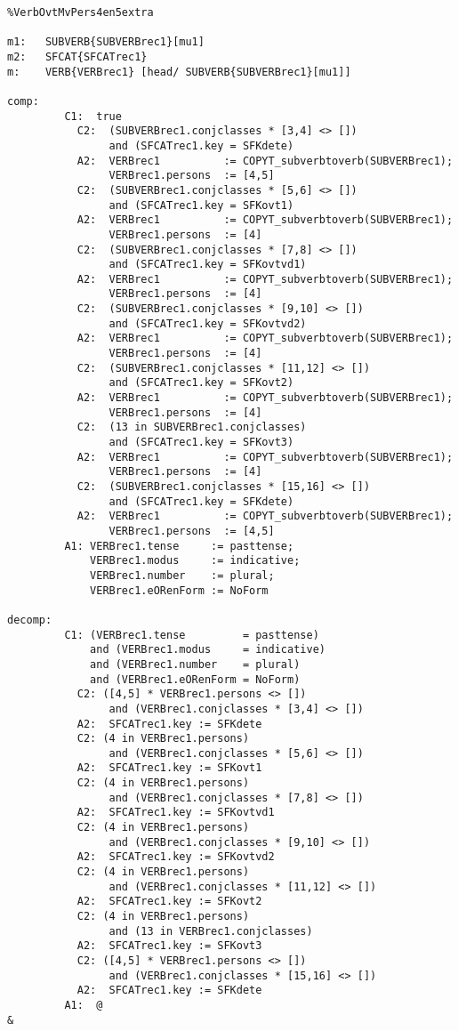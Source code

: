 \begin{verbatim}
%VerbOvtMvPers4en5extra

m1:   SUBVERB{SUBVERBrec1}[mu1]
m2:   SFCAT{SFCATrec1}
m:    VERB{VERBrec1} [head/ SUBVERB{SUBVERBrec1}[mu1]]

comp:
         C1:  true
           C2:  (SUBVERBrec1.conjclasses * [3,4] <> [])
                and (SFCATrec1.key = SFKdete)
           A2:  VERBrec1          := COPYT_subverbtoverb(SUBVERBrec1);
                VERBrec1.persons  := [4,5]
           C2:  (SUBVERBrec1.conjclasses * [5,6] <> [])
                and (SFCATrec1.key = SFKovt1)
           A2:  VERBrec1          := COPYT_subverbtoverb(SUBVERBrec1);
                VERBrec1.persons  := [4]
           C2:  (SUBVERBrec1.conjclasses * [7,8] <> [])
                and (SFCATrec1.key = SFKovtvd1)
           A2:  VERBrec1          := COPYT_subverbtoverb(SUBVERBrec1);
                VERBrec1.persons  := [4]
           C2:  (SUBVERBrec1.conjclasses * [9,10] <> [])
                and (SFCATrec1.key = SFKovtvd2)
           A2:  VERBrec1          := COPYT_subverbtoverb(SUBVERBrec1);
                VERBrec1.persons  := [4]
           C2:  (SUBVERBrec1.conjclasses * [11,12] <> [])
                and (SFCATrec1.key = SFKovt2)
           A2:  VERBrec1          := COPYT_subverbtoverb(SUBVERBrec1);
                VERBrec1.persons  := [4]
           C2:  (13 in SUBVERBrec1.conjclasses) 
                and (SFCATrec1.key = SFKovt3)
           A2:  VERBrec1          := COPYT_subverbtoverb(SUBVERBrec1);
                VERBrec1.persons  := [4]
           C2:  (SUBVERBrec1.conjclasses * [15,16] <> []) 
                and (SFCATrec1.key = SFKdete)
           A2:  VERBrec1          := COPYT_subverbtoverb(SUBVERBrec1);
                VERBrec1.persons  := [4,5]
         A1: VERBrec1.tense     := pasttense;
             VERBrec1.modus     := indicative;
             VERBrec1.number    := plural;
             VERBrec1.eORenForm := NoForm

decomp:
         C1: (VERBrec1.tense         = pasttense) 
             and (VERBrec1.modus     = indicative) 
             and (VERBrec1.number    = plural) 
             and (VERBrec1.eORenForm = NoForm)
           C2: ([4,5] * VERBrec1.persons <> [])
                and (VERBrec1.conjclasses * [3,4] <> [])
           A2:  SFCATrec1.key := SFKdete
           C2: (4 in VERBrec1.persons)
                and (VERBrec1.conjclasses * [5,6] <> [])
           A2:  SFCATrec1.key := SFKovt1
           C2: (4 in VERBrec1.persons)
                and (VERBrec1.conjclasses * [7,8] <> [])
           A2:  SFCATrec1.key := SFKovtvd1
           C2: (4 in VERBrec1.persons)
                and (VERBrec1.conjclasses * [9,10] <> [])
           A2:  SFCATrec1.key := SFKovtvd2
           C2: (4 in VERBrec1.persons)
                and (VERBrec1.conjclasses * [11,12] <> [])
           A2:  SFCATrec1.key := SFKovt2
           C2: (4 in VERBrec1.persons)
                and (13 in VERBrec1.conjclasses)
           A2:  SFCATrec1.key := SFKovt3
           C2: ([4,5] * VERBrec1.persons <> [])
                and (VERBrec1.conjclasses * [15,16] <> [])
           A2:  SFCATrec1.key := SFKdete
         A1:  @
&
\end{verbatim}
\newpage
